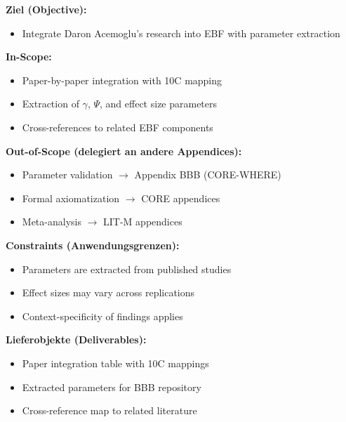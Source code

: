 
\begin{tcolorbox}[
    colback=orange!5!white,
    colframe=orange!75!black,
    title={\textbf{Appendix Scope: Ziel / In-Scope / Out-of-Scope / Constraints}},
    fonttitle=\bfseries
]

\textbf{Ziel (Objective):}
\begin{itemize}[nosep]
    \item Integrate Daron Acemoglu's research into EBF with parameter extraction
\end{itemize}

\textbf{In-Scope:}
\begin{itemize}[nosep]
    \item Paper-by-paper integration with 10C mapping
    \item Extraction of $\gamma$, $\Psi$, and effect size parameters
    \item Cross-references to related EBF components
\end{itemize}

\textbf{Out-of-Scope (delegiert an andere Appendices):}
\begin{itemize}[nosep]
    \item Parameter validation $\rightarrow$ Appendix BBB (CORE-WHERE)
    \item Formal axiomatization $\rightarrow$ CORE appendices
    \item Meta-analysis $\rightarrow$ LIT-M appendices
\end{itemize}

\textbf{Constraints (Anwendungsgrenzen):}
\begin{itemize}[nosep]
    \item Parameters are extracted from published studies
    \item Effect sizes may vary across replications
    \item Context-specificity of findings applies
\end{itemize}

\textbf{Lieferobjekte (Deliverables):}
\begin{itemize}[nosep]
    \item Paper integration table with 10C mappings
    \item Extracted parameters for BBB repository
    \item Cross-reference map to related literature
\end{itemize}

\end{tcolorbox}

